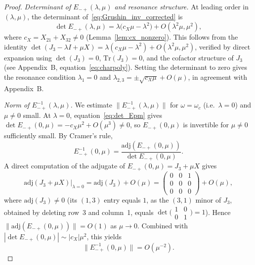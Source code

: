 \documentclass[12pt,a4paper]{amsart}
\theoremstyle{remark}
\begin{document}
\begin{proof}
\emph{Determinant of $E_{-+}(\lambda,\mu)$ and resonance structure.}
At leading order in $(\lambda,\mu)$, the determinant of~\eqref{eq:Grushin_inv_corrected} is
\begin{equation}\label{eq:det_Epm}
  \det E_{-+}(\lambda,\mu) = \lambda\bigl(c_X\mu - \lambda^2\bigr) + O(\lambda^2\mu,\mu^2),
\end{equation}
where $c_X = X_{21} + X_{32} \neq 0$ (Lemma~\ref{lem:cx_nonzero}).
This follows from the identity $\det(J_3 - \lambda I + \mu X)
= \lambda(c_X \mu - \lambda^2) + O(\lambda^2\mu, \mu^2)$,
verified by direct expansion using $\det(J_3) = 0$, $\mathrm{Tr}(J_3) = 0$,
and the cofactor structure of $J_3$ (see Appendix~B, equation~\eqref{eq:charpoly}).
Setting the determinant to zero gives the resonance condition
$\lambda_1 = 0$ and $\lambda_{2,3} = \pm\sqrt{c_X\mu} + O(\mu)$,
in agreement with Appendix~B.

\emph{Norm of $E_{-+}^{-1}(\lambda,\mu)$.}
We estimate $\|E_{-+}^{-1}(\lambda,\mu)\|$ for $\omega = \omega_c$ (i.e.\ $\lambda = 0$)
and $\mu \neq 0$ small.
At $\lambda = 0$, equation~\eqref{eq:det_Epm} gives
$\det E_{-+}(0,\mu) = -c_X\mu^2 + O(\mu^3) \neq 0$,
so $E_{-+}(0,\mu)$ is invertible for $\mu \neq 0$ sufficiently small.
By Cramer's rule,
\[
  E_{-+}^{-1}(0,\mu) = \frac{\mathrm{adj}(E_{-+}(0,\mu))}{\det E_{-+}(0,\mu)}.
\]
A direct computation of the adjugate of $E_{-+}(0,\mu) = J_3 + \mu X$ gives
\[
  \mathrm{adj}(J_3 + \mu X)\big|_{\lambda=0}
  = \mathrm{adj}(J_3) + O(\mu)
  = \begin{pmatrix}0&0&1\\0&0&0\\0&0&0\end{pmatrix} + O(\mu),
\]
where $\mathrm{adj}(J_3) \neq 0$ (its $(1,3)$ entry equals $1$, as the $(3,1)$ minor
of $J_3$, obtained by deleting row~3 and column~1, equals
$\det\bigl(\begin{smallmatrix}1&0\\0&1\end{smallmatrix}\bigr) = 1$).
Hence $\|\mathrm{adj}(E_{-+}(0,\mu))\| = O(1)$ as $\mu\to 0$.
Combined with $|\det E_{-+}(0,\mu)| \sim |c_X|\mu^2$, this yields
\begin{equation}\label{eq:Einv_upper}
  \|E_{-+}^{-1}(0,\mu)\| = O(\mu^{-2}).
\end{equation}


\end{proof}
\end{document}
